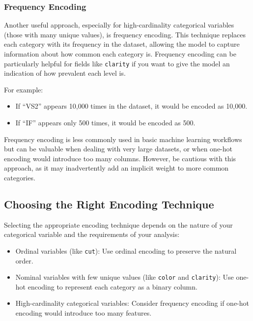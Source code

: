 \documentclass[
  11pt,
]{book}
\newcommand{\passthrough}[1]{#1}
\providecommand{\tightlist}{%
  \setlength{\itemsep}{0pt}\setlength{\parskip}{0pt}}
\theoremstyle{definition}
\theoremstyle{definition}
\theoremstyle{definition}
\theoremstyle{definition}
\theoremstyle{remark}
\begin{document}
\subsubsection*{Frequency Encoding}\label{frequency-encoding}


Another useful approach, especially for high-cardinality categorical variables (those with many unique values), is frequency encoding. This technique replaces each category with its frequency in the dataset, allowing the model to capture information about how common each category is. Frequency encoding can be particularly helpful for fields like \passthrough{\lstinline!clarity!} if you want to give the model an indication of how prevalent each level is.

For example:

\begin{itemize}
\tightlist
\item
  If ``VS2'' appears 10,000 times in the dataset, it would be encoded as 10,000.
\item
  If ``IF'' appears only 500 times, it would be encoded as 500.
\end{itemize}

Frequency encoding is less commonly used in basic machine learning workflows but can be valuable when dealing with very large datasets, or when one-hot encoding would introduce too many columns. However, be cautious with this approach, as it may inadvertently add an implicit weight to more common categories.

\subsection{Choosing the Right Encoding Technique}\label{choosing-the-right-encoding-technique}

Selecting the appropriate encoding technique depends on the nature of your categorical variable and the requirements of your analysis:

\begin{itemize}
\tightlist
\item
  Ordinal variables (like \passthrough{\lstinline!cut!}): Use ordinal encoding to preserve the natural order.
\item
  Nominal variables with few unique values (like \passthrough{\lstinline!color!} and \passthrough{\lstinline!clarity!}): Use one-hot encoding to represent each category as a binary column.
\item
  High-cardinality categorical variables: Consider frequency encoding if one-hot encoding would introduce too many features.
\end{itemize}
\end{document}
